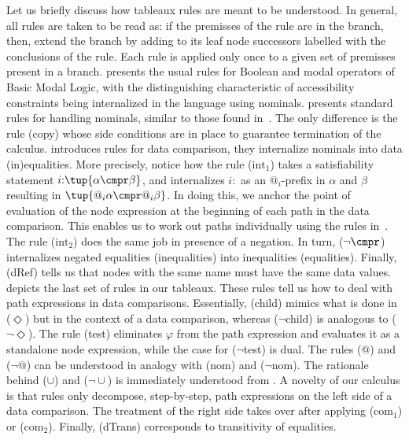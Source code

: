 

Let us briefly discuss how tableaux rules are meant to be understood. 
In general, all rules are taken to be read as: if the premisses of the rule are in the branch, then, extend the branch by adding to its leaf node successors labelled with the conclusions of the rule. Each rule is applied only once to a given set of premisses present in a branch.
 presents the usual rules for Boolean and modal operators of Basic Modal Logic, with the distinguishing characteristic of accessibility constraints being internalized in the language using nominals.
 presents standard rules for handling nominals, similar to those found in~\cite{BolanderB07,Brauner2011}.
The only difference is the rule (copy) whose side conditions are in place to guarantee termination of the calculus. 
 introduces rules for data comparison, they internalize nominals into data (in)equalities.
More precisely, notice how the rule ($\mathrm{int}_1$) takes a satisfiability statement $i{:}\tup{\alpha \cmpr \beta}$, and internalizes $i{:}$ as an $@_i$-prefix in $\alpha$ and $\beta$ resulting in $\tup{@_i\alpha \cmpr @_i\beta}$. In doing this, we anchor the point of evaluation of the node expression at the beginning of each path in the data comparison.
This enables us to work out paths individually using the rules in~. The rule ($\mathrm{int}_2$) does the same job in presence of a negation. In turn, ($\neg{\cmpr}$) internalizes negated equalities (inequalities) into inequalities (equalities). 
Finally, (dRef) tells us that nodes with the same name must have the same data values.
 depicts the last set of rules in our tableaux.
These rules tell us how to deal with path expressions in data comparisons. 
Essentially, (child) mimics what is done in ($\Diamond$) but in the context of a data comparison, whereas ($\lnot$child) is analogous to (${\lnot}{\Diamond}$).
The rule (test) eliminates $\varphi$ from the path expression and evaluates it as a standalone node expression, while the case for ($\lnot$test) is dual. 
The rules ($@$) and (${\lnot}{@}$) can be understood in analogy with (nom) and (${\lnot}$nom).
The rationale behind ($\cup$) and (${\lnot}{\cup}$) is immediately understood from . 
A novelty of our calculus is that rules only decompose, step-by-step, path expressions on the left side of a data comparison.
The treatment of the right side takes over after applying ($\mathrm{com}_1$) or  ($\mathrm{com}_2$). 
Finally, (dTrans) corresponds to transitivity of equalities.


